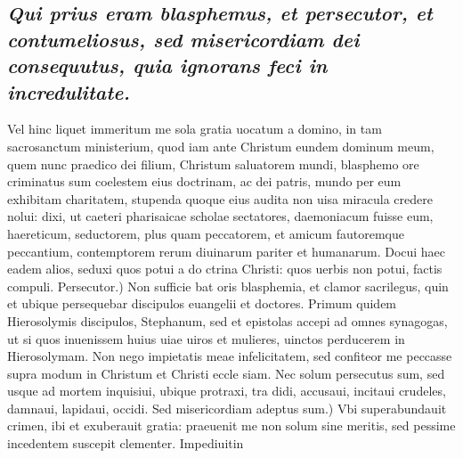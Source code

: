 \documentclass{article}
\begin{document}
\begin{pages}
\subsection*{\textit{Qui prius eram blasphemus, et persecutor, et contumeliosus, sed misericordiam dei consequutus, quia ignorans feci in incredulitate. }}\pstart Vel hinc liquet immeritum me sola gratia uocatum a domino, in tam sacrosanctum ministerium, quod iam ante Christum eundem dominum meum, quem nunc praedico dei filium, Christum saluatorem mundi, blasphemo ore criminatus sum coelestem eius doctrinam, ac dei patris, mundo per eum exhibitam charitatem, stupenda quoque eius audita non uisa miracula credere nolui: dixi, ut caeteri pharisaicae scholae sectatores, daemoniacum fuisse eum, haereticum, seductorem, plus quam peccatorem, et amicum fautoremque peccantium, contemptorem rerum diuinarum pariter et humanarum. Docui haec eadem alios, seduxi quos potui a do ctrina Christi: quos uerbis non potui, factis compuli. Persecutor.) Non sufficie bat oris blasphemia, et clamor sacrilegus, quin et ubique persequebar discipulos euangelii et doctores. Primum quidem Hierosolymis discipulos, Stephanum, sed et epistolas accepi ad omnes synagogas, ut si quos inuenissem huius uiae uiros et mulieres, uinctos perducerem in Hierosolymam. Non nego impietatis meae infelicitatem, sed confiteor me peccasse supra modum in Christum et Christi eccle siam. Nec solum persecutus sum, sed usque ad mortem inquisiui, ubique protraxi, tra didi, accusaui, incitaui crudeles, damnaui, lapidaui, occidi. Sed misericordiam adeptus sum.) Vbi superabundauit crimen, ibi et exuberauit gratia: praeuenit me non solum sine meritis, sed pessime incedentem suscepit clementer. Impediuitin  \pend

\end{pages}
\end{document}
